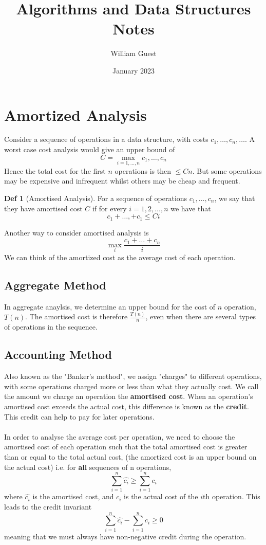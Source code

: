 \documentclass{article}
\title{Algorithms and Data Structures Notes}
\author{William Guest}
\date{January 2023}
\theoremstyle{plain}
\theoremstyle{definition}
\newtheorem{defn}[dummy]{Def}
\begin{document}
\maketitle

\section{Amortized Analysis}
    Consider a sequence of operations in a data structure, with costs $c_1, \ldots, c_n, \ldots$. A worst case cost analysis would give an upper bound of
    \[ C = \max_{i=1,\ldots,n} c_1, \ldots, c_n \]
    Hence the total cost for the first $n$ operations is then $\leq Cn$. But some operations may be expensive and infrequent whilst others may be cheap and frequent. 
    \begin{defn}[Amortised Analysis]
        For a sequence of operations $c_1, \ldots, c_n$, we say that they have amortised cost $C$ if for every $i = 1, 2, \ldots, n$ we have that
        \[ c_1 + \ldots, + c_1 \leq Ci \]
    \end{defn}
    Another way to consider amortised analysis is
    \[ \max_i \frac{c_1 + \ldots + c_n}{i} \]
    We can think of the amortized cost as the average cost of each operation. 
    \subsection{Aggregate Method}
        In aggregate anaylsis, we determine an upper bound for the cost of $n$ operation, $T(n)$. The amortised cost is therefore $\frac{T(n)}{n}$, even when there are several types of operations in the sequence. 
    \subsection{Accounting Method}
        Also known as the "Banker's method", we assign "charges" to different operations, with some operations charged more or less than what they actually cost. We call the amount we charge an operation the \textbf{amortised cost}. When an operation's amortised cost exceeds the actual cost, this difference is known as the \textbf{credit}. This credit can help to pay for later operations. \\ \\
        In order to analyse the average cost per operation, we need to choose the amortised cost of each operation such that the total amortised cost is greater than or equal to the total actual cost, 
        (the amortized cost is an upper bound on the actual cost)
        i.e. for \textbf{all} sequences of n operations, 
        \[ \sum^n_{i=1} \hat{c_i} \geq \sum^n_{i=1} c_i \]
        where $\hat{c_i}$ is the amortised cost, and $c_i$ is the actual cost of the $i$th operation. This leads to the credit invariant
        \[ \sum^n_{i=1} \hat{c_i} - \sum^n_{i=1} c_i \geq 0 \]
        meaning that we must always have non-negative credit during the operation. 
\end{document}
